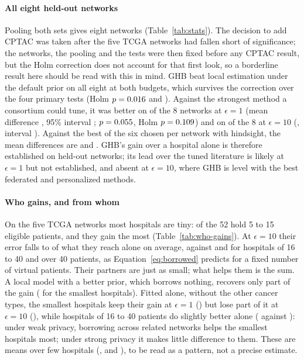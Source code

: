\paragraph{All eight held-out networks} Pooling both sets gives eight networks (Table~\ref{tab:stats}). The decision to add CPTAC was taken after the five TCGA networks had fallen short of significance; the networks, the pooling and the tests were then fixed before any CPTAC result, but the Holm correction does not account for that first look, so a borderline result here should be read with this in mind. GHB beat local estimation under the default prior on all eight at both budgets, which survives the correction over the four primary tests (Holm $p=0.016$ and \SimStHTenLocHolm). Against the strongest method a consortium could tune, it was better on \SimStHOneRealWins{} of the 8 networks at $\epsilon=1$ (mean difference \SimStHOneRealMean, 95\% interval \SimStHOneRealCI; $p=0.055$, Holm $p=0.109$) and on \SimStHTenRealWins{} of the 8 at $\epsilon=10$ (\SimStHTenRealMean, interval \SimStHTenRealCI). Against the best of the six chosen per network with hindsight, the mean differences are \SimStHOneNetMean{} and \SimStHTenNetMean. GHB's gain over a hospital alone is therefore established on held-out networks; its lead over the tuned literature is likely at $\epsilon=1$ but not established, and absent at $\epsilon=10$, where GHB is level with the best federated and personalized methods.

\paragraph{Who gains, and from whom} On the five TCGA networks most hospitals are tiny: \SimWhoSmallHosp{} of the 52 hold 5 to 15 eligible patients, and they gain the most (Table~\ref{tab:who-gains}). At $\epsilon=10$ their error falls to \SimWhoTogSmallTen{} of what they reach alone on average, against \SimWhoTogMidTen{} and \SimWhoTogLargeTen{} for hospitals of 16 to 40 and over 40 patients, as Equation~\eqref{eq:borrowed} predicts for a fixed number of virtual patients. Their partners are just as small; what helps them is the sum. A local model with a better prior, which borrows nothing, recovers only part of the gain (\SimWhoSmallEB{} for the smallest hospitals). Fitted alone, without the other cancer types, the smallest hospitals keep their gain at $\epsilon=1$ (\SimWhoAloneSmallOne) but lose part of it at $\epsilon=10$ (\SimWhoAloneSmallTen), while hospitals of 16 to 40 patients do slightly better alone (\SimWhoAloneMidTen{} against \SimWhoTogMidTen): under weak privacy, borrowing across related networks helps the smallest hospitals most; under strong privacy it makes little difference to them. These are means over few hospitals (\SimWhoSmallHosp, \SimWhoMidHosp{} and \SimWhoLargeHosp), to be read as a pattern, not a precise estimate.

